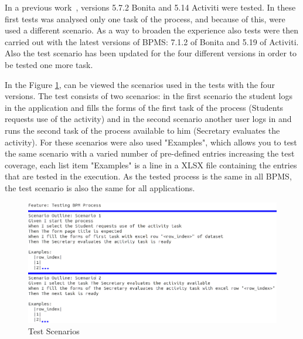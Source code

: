 \documentclass[runningheads,a4paper]{llncs}
\begin{document}
In a previous work~\cite{sbqs2015}, versions 5.7.2 Bonita and 5.14 Activiti were tested. In these first tests was analysed only one task of the process, and because of this, were used a different scenario. As a way to broaden the experience also tests were then carried out with the latest versions of BPMS: 7.1.2 of Bonita and 5.19 of Activiti. Also the test scenario has been updated for the four different versions in order to be tested one more task. 

In the Figure \ref{fig:cenario2}, can be viewed the scenarios used in the tests with the four versions. The test consists of two scenarios: in the first scenario the student logs in the application and fills the forms of the first task of the process (Students requests use of the activity) and in the second scenario another user logs in and runs the second task of the process available to him (Secretary evaluates the activity). For these scenarios were also used "Examples", which allows you to test the same scenario with a varied number of pre-defined entries increasing the test coverage, each list item "Examples" is a line in a XLSX file containing the entries that are tested in the execution. As the tested process is the same in all BPMS, the test scenario is also the same for all applications.

\begin{figure}[ht]
\centering
\includegraphics[width=1\textwidth]{figuras/cenario_traduzido2.png}
\caption{Test Scenarios}
\label{fig:cenario2}
\end{figure}
\end{document}
